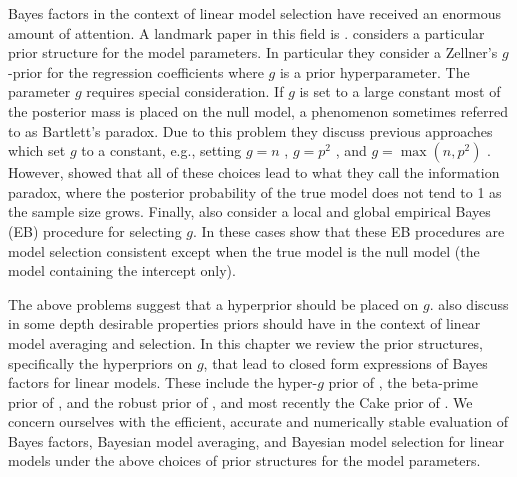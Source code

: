 %	


Bayes factors in the context of linear model selection 
\citep{Zellner1980,
	Zellner1980b,
	Mitchell1988,
	George1993,
	Fernandez2001,
	Liang2008,
	Maruyama2011,
	Bayarri2012}
have received an enormous amount of attention. A landmark paper in this field
is \cite{Liang2008}.  \cite{Liang2008} considers a particular prior structure
for the model parameters.  In particular they consider a Zellner's $g$-prior
\citep{Zellner1980,Zellner1986} for the regression coefficients where $g$ is a
prior hyperparameter. The parameter $g$ requires special consideration. If $g$
is set to a large constant most of the posterior mass is placed on the null
model, a phenomenon sometimes referred to as Bartlett's paradox.  Due to this
problem they discuss previous approaches which set $g$ to a constant, e.g.,
setting $g=n$ \citep{Kass1995b},  $g=p^2$ \citep{Foster1994}, and
$g=\max(n,p^2)$ \citep{Fernandez2001}. However, \cite{Liang2008} showed that
all of these choices lead to what they call the information paradox, where the
posterior probability of the true model does not tend to 1 as the sample size
grows. Finally, \cite{Liang2008} also consider a local and global empirical
Bayes (EB) procedure for selecting $g$. In these cases \cite{Liang2008} show
that these EB procedures are model selection consistent except when the true
model is the null model (the model containing the intercept only). 


The above problems suggest that a hyperprior should be placed on $g$.
\cite{Bayarri2012} also discuss in some depth desirable properties priors
should have in the context of linear model averaging and selection.  In this
chapter we review the prior structures, specifically the hyperpriors on $g$,
that lead to closed form expressions of Bayes factors for linear models.  These
include the hyper-$g$ prior of \cite{Liang2008}, the beta-prime prior of
\cite{Maruyama2011}, and the robust prior of \cite{Bayarri2012}, and most
recently the Cake prior of \cite{OrmerodEtal2017}.
We concern ourselves with the efficient, accurate and numerically stable
evaluation of Bayes factors, Bayesian model averaging, and Bayesian model
selection  for linear models under the above choices of prior structures for
the model parameters.


